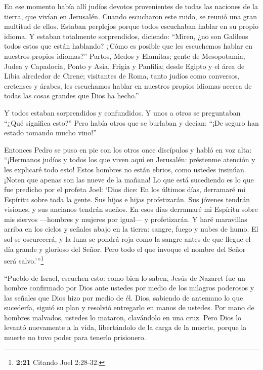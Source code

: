  En ese momento había allí judíos devotos provenientes de
todas las naciones de la tierra, que vivían en Jerusalén. 
Cuando escucharon este ruido, se reunió una gran multitud de ellos.
Estaban perplejos porque todos escuchaban hablar en su propio idioma.
 Y estaban totalmente sorprendidos, diciendo: ``Miren, ¿no
son Galileos todos estos que están hablando?  ¿Cómo es
posible que les escuchemos hablar en nuestros propios idiomas?''
 Partos, Medos y Elamitas; gente de Mesopotamia, Judea y
Capadocia, Ponto y Asia,  Frigia y Panfilia; desde Egipto y
el área de Libia alrededor de Cirene; visitantes de Roma, tanto judíos
como conversos,  cretenses y árabes, les escuchamos hablar
en nuestros propios idiomas acerca de todas las cosas grandes que Dios
ha hecho.''

 Y todos estaban sorprendidos y confundidos. Y unos a otros
se preguntaban ``¿Qué significa esto?''  Pero había otros
que se burlaban y decían: ``¡De seguro han estado tomando mucho vino!''

 Entonces Pedro se puso en pie con los otros once
discípulos y habló en voz alta: ``¡Hermanos judíos y todos los que viven
aquí en Jerusalén: préstenme atención y les explicaré todo esto!
 Estos hombres no están ebrios, como ustedes insinúan.
¡Noten que apenas son las nueve de la mañana!  Lo que está
sucediendo es lo que fue predicho por el profeta Joel: 
`Dios dice: En los últimos días, derramaré mi Espíritu sobre toda la
gente. Sus hijos e hijas profetizarán. Sus jóvenes tendrán visiones, y
sus ancianos tendrán sueños.  En esos días derramaré mi
Espíritu sobre mis siervos ---hombres y mujeres por igual--- y
profetizarán.  Y haré maravillas arriba en los cielos y
señales abajo en la tierra: sangre, fuego y nubes de humo. 
El sol se oscurecerá, y la luna se pondrá roja como la sangre antes de
que llegue el día grande y glorioso del Señor.  Pero todo
el que invoque el nombre del Señor será salvo.'''\footnote{\textbf{2:21}
  Citando Joel 2:28-32.}

 ``Pueblo de Israel, escuchen esto: como bien lo saben,
Jesús de Nazaret fue un hombre confirmado por Dios ante ustedes por
medio de los milagros poderosos y las señales que Dios hizo por medio de
él.  Dios, sabiendo de antemano lo que sucedería, siguió su
plan y resolvió entregarlo en manos de ustedes. Por mano de hombres
malvados, ustedes lo mataron, clavándolo en una cruz.  Pero
Dios lo levantó nuevamente a la vida, libertándolo de la carga de la
muerte, porque la muerte no tuvo poder para tenerlo prisionero.

